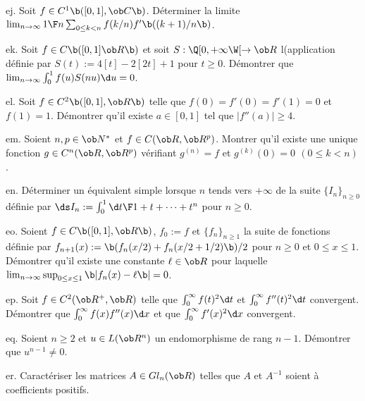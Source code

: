 \exo [Level=1,Fight=2,Learn=2,Type=\Exercices,Field=\SommesDeRiemann,Origin=] ej. 
Soit $f\in\sc C^1\b([0,1],\ob C\b)$. Déterminer 
la limite $\lim_{n\to\infty}{1\F n}\sum_{0\le k< n}f(k/n)f'\b((k+1)/n\b)$. 

\exo [Level=1,Fight=2,Learn=2,Type=\Exercices,Field=\Intégration,Origin=] ek. 
Soit $f\in\sc C\b([0,1]\ob R\b)$ et soit $S:\Q[0,+\infty\W[\to\ob R$ l(application définie par $S(t):=4[t]-2[2t]+1$ pour $t\ge0$. 
Démontrer que $\lim_{n\to\infty}\int_0^1f(u)S(nu)\d u=0$. 

\exo [Level=1,Fight=2,Learn=2,Type=\Exercices,Field=\ThéorèmeDeRolle,Origin=] el. 
Soit $f\in\sc C^2\b([0,1],\ob R\b)$ telle que $f(0)=f'(0)=f'(1)=0$ et $f(1)=1$. 
Démontrer qu'il existe $a\in[0,1]$ tel que $|f''(a)|\ge4$. 

\exo [Level=1,Fight=2,Learn=2,Type=\Exercices,Field=\ThéorèmeDeRolle,Origin=,Indication={On pourra vérifier que $\ds\forall x\in\ob R, g(x)=\int_0^x{(x-t)^{n-1}\F(n-1)!}f(t)\d t$.}] em. 
Soient $n,p\in\ob N^*$ et $f\in\sc C(\ob R,\ob R^p)$. 
Montrer qu'il existe une unique fonction $g\in\sc C^n(\ob R,\ob R^p)$ 
vérifiant $g^{(n)}=f$ et $g^{(k)}(0)=0\ \,(0\le k<n)$. \pn


\exo [Level=1,Fight=2,Learn=2,Type=\Exercices,Field=\DéveloppementsLimités|\Intégration,Origin=] en. 
Déterminer un équivalent simple lorsque $n$ tends vers $+\infty$ de la suite $\{I_n\}_{n\ge0}$ définie par 
$\ds I_n:=\int_0^1{\d t\F1+t+\cdots+t^n}$ pour $n\ge0$. 

\exo [Level=1,Fight=2,Learn=1,Type=\Exercices,Field=\Suites,Origin=] eo. 
Soient $f\in\sc C\b([0,1],\ob R\b)$, $f_0:=f$ et $\{f_n\}_{n\ge1}$ 
la suite de fonctions définie par $f_{n+1}(x):=\b(f_n(x/2)+f_n(x/2+1/2)\b)/2$ 
pour $n\ge0$ et $0\le x\le 1$. Démontrer qu'il existe une constante $\ell\in\ob R$ 
pour laquelle $\lim_{n\to\infty}\sup_{0\le x\le 1}\b|f_n(x)-\ell\b|=0$. 

\exo [Level=1,Fight=2,Learn=2,Type=\Exercices,Field=\IntégralesGénéralisées,Origin=] ep. 
Soit $f\in\sc C^2(\ob R^+,\ob R)$ telle que $\int_0^\infty f(t)^2\d t$ et $\int_0^\infty f''(t)^2\d t$ convergent. \pn
Démontrer que $\int_0^\infty f(x)f''(x)\d x$ et que $\int_0^\infty f'(x)^2\d x$ convergent. 

\exo [Level=1,Fight=1,Learn=1,Type=\Exercices,Field=\Rang,Origin=] eq. 
Soient $n\ge2$ et $u\in\sc L(\ob R^n)$ un endomorphisme de rang $n-1$. 
Démontrer que $u^{n-1}\neq0$. 

\exo [Level=1,Fight=2,Learn=1,Type=\Exercices,Field=\Matrices,Origin=] er. 
Caractériser les matrices $A\in\sc Gl_n(\ob R)$ telles que $A$ et $A^{-1}$ soient à coefficients positifs. 

